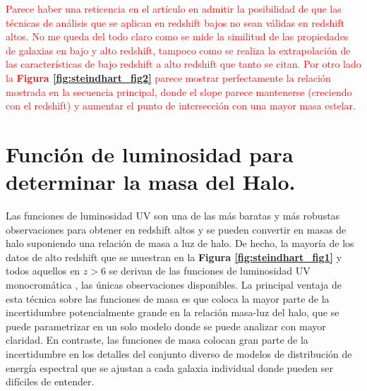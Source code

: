 \documentclass{article}
\begin{document}
\textcolor{red}{Parece haber una reticencia en el artículo en admitir la posibilidad de que las técnicas de análisis que se aplican en redshift bajos no sean válidas en redshift altos. No me queda del todo claro como se mide la similitud de las propiedades de galaxias en bajo y alto redshift, tampoco como se realiza la extrapolación de las características de bajo redshift a alto redshift que tanto se citan. Por otro lado la \textbf{Figura \ref{fig:steindhart_fig2}} parece mostrar perfectamente la relación mostrada en la secuencia principal, donde el slope parece mantenerse (creciendo con el redshift) y aumentar el punto de intersección con una mayor masa estelar.}

\section{Función de luminosidad para determinar la masa del Halo.}
Las funciones de luminosidad UV son una de las más baratas y más robustas observaciones para obtener en redshift altos y se pueden convertir en masas de halo suponiendo una relación de masa a luz de halo. De hecho, la mayoría de los datos de alto redshift que se muestran en la \textbf{Figura \ref{fig:steindhart_fig1}} y todos aquellos en $z> 6$ se derivan de las funciones de luminosidad UV monocromática , las únicas observaciones disponibles. La principal ventaja de esta técnica sobre las funciones de masa es que coloca la mayor parte de la incertidumbre potencialmente grande en la relación masa-luz del halo, que se puede parametrizar en un solo modelo donde se puede analizar con mayor claridad. En contraste, las funciones de masa colocan gran parte de la incertidumbre en los detalles del conjunto diverso de modelos de distribución de energía espectral que se ajustan a cada galaxia individual donde pueden ser difíciles de entender.\\
\end{document}

